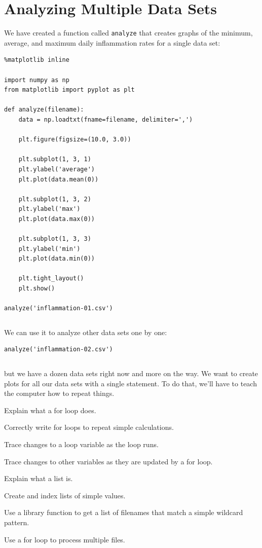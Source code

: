 \documentclass{book}
\begin{document}
\section{Analyzing Multiple Data Sets}

We have created a function called \texttt{analyze} that creates graphs
of the minimum, average, and maximum daily inflammation rates for a
single data set:

\begin{verbatim}
%matplotlib inline

import numpy as np
from matplotlib import pyplot as plt

def analyze(filename):
    data = np.loadtxt(fname=filename, delimiter=',')

    plt.figure(figsize=(10.0, 3.0))

    plt.subplot(1, 3, 1)
    plt.ylabel('average')
    plt.plot(data.mean(0))

    plt.subplot(1, 3, 2)
    plt.ylabel('max')
    plt.plot(data.max(0))

    plt.subplot(1, 3, 3)
    plt.ylabel('min')
    plt.plot(data.min(0))

    plt.tight_layout()
    plt.show()

analyze('inflammation-01.csv')
\end{verbatim}

\begin{verbatim}
\end{verbatim}

We can use it to analyze other data sets one by one:

\begin{verbatim}
analyze('inflammation-02.csv')
\end{verbatim}

\begin{verbatim}
\end{verbatim}

but we have a dozen data sets right now and more on the way. We want to
create plots for all our data sets with a single statement. To do that,
we'll have to teach the computer how to repeat things.

\begin{objectives}
\begin{swcitemize}
\item
  Explain what a for loop does.
\item
  Correctly write for loops to repeat simple calculations.
\item
  Trace changes to a loop variable as the loop runs.
\item
  Trace changes to other variables as they are updated by a for loop.
\item
  Explain what a list is.
\item
  Create and index lists of simple values.
\item
  Use a library function to get a list of filenames that match a simple
  wildcard pattern.
\item
  Use a for loop to process multiple files.
\end{swcitemize}
\end{objectives}
\end{document}
